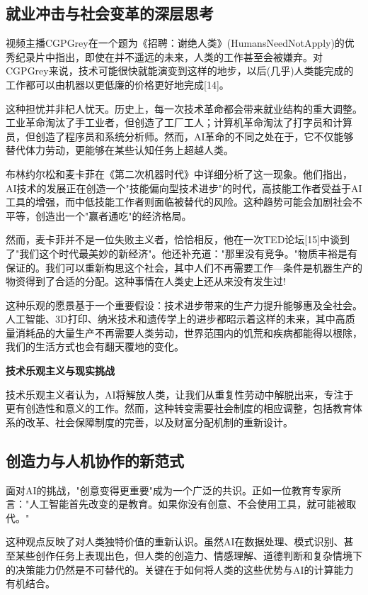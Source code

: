 \subsection{就业冲击与社会变革的深层思考}

视频主播CGPGrey在一个题为《招聘：谢绝人类》(HumansNeedNotApply)的优秀纪录片中指出，即使在并不遥远的未来，人类的工作甚至会被嫌弃。对CGPGrey来说，技术可能很快就能演变到这样的地步，以后(几乎)人类能完成的工作都可以由机器以更低廉的价格更好地完成[14]。

这种担忧并非杞人忧天。历史上，每一次技术革命都会带来就业结构的重大调整。工业革命淘汰了手工业者，但创造了工厂工人；计算机革命淘汰了打字员和计算员，但创造了程序员和系统分析师。然而，AI革命的不同之处在于，它不仅能够替代体力劳动，更能够在某些认知任务上超越人类。

布林约尔松和麦卡菲在《第二次机器时代》中详细分析了这一现象。他们指出，AI技术的发展正在创造一个"技能偏向型技术进步"的时代，高技能工作者受益于AI工具的增强，而中低技能工作者则面临被替代的风险。这种趋势可能会加剧社会不平等，创造出一个"赢者通吃"的经济格局。

然而，麦卡菲并不是一位失败主义者，恰恰相反，他在一次TED论坛[15]中谈到了"我们这个时代最美妙的新经济"。他还补充道："那里没有竞争。"物质丰裕是有保证的。我们可以重新构思这个社会，其中人们不再需要工作---条件是机器生产的物资得到了合适的分配。这种事情在人类史上还从来没有发生过!

这种乐观的愿景基于一个重要假设：技术进步带来的生产力提升能够惠及全社会。人工智能、3D打印、纳米技术和遗传学上的进步都昭示着这样的未来，其中高质量消耗品的大量生产不再需要人类劳动，世界范围内的饥荒和疾病都能得以根除，我们的生活方式也会有翻天覆地的变化。

\begin{center}
{\bf 技术乐观主义与现实挑战}

技术乐观主义者认为，AI将解放人类，让我们从重复性劳动中解脱出来，专注于更有创造性和意义的工作。然而，这种转变需要社会制度的相应调整，包括教育体系的改革、社会保障制度的完善，以及财富分配机制的重新设计。
\end{center}

\subsection{创造力与人机协作的新范式}

面对AI的挑战，"创意变得更重要"成为一个广泛的共识。正如一位教育专家所言："人工智能首先改变的是教育。如果你没有创意、不会使用工具，就可能被取代。"

这种观点反映了对人类独特价值的重新认识。虽然AI在数据处理、模式识别、甚至某些创作任务上表现出色，但人类的创造力、情感理解、道德判断和复杂情境下的决策能力仍然是不可替代的。关键在于如何将人类的这些优势与AI的计算能力有机结合。

